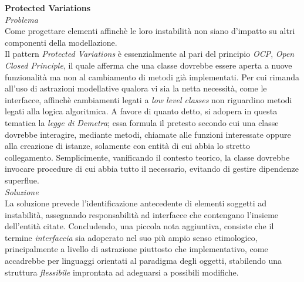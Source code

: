 \documentclass{article}
\begin{document}
\textbf{Protected Variations}\vspace*{7pt}\\
\textit{Problema}\\
Come progettare elementi affinchè le loro instabilità non siano d'impatto su altri componenti della modellazione.\vspace*{14pt}\\
Il pattern \textit{Protected Variations} è essenzialmente al pari del principio \textit{OCP}, \textit{Open Closed Principle}, il quale afferma che una classe dovrebbe essere aperta a nuove funzionalità ma non al cambiamento di metodi già implementati. Per cui rimanda all'uso di astrazioni modellative qualora vi sia la netta necessità, come le interfacce, affinchè cambiamenti legati a \textit{low level classes} non riguardino metodi legati alla logica algoritmica. A favore di quanto detto, si adopera in questa tematica la \textit{legge di Demetra}; essa formula il pretesto secondo cui una classe dovrebbe interagire, mediante metodi, chiamate alle funzioni interessate oppure alla creazione di istanze, solamente con entità di cui abbia lo stretto collegamento. Semplicimente, vanificando il contesto teorico, la classe dovrebbe invocare procedure di cui abbia tutto il necessario, evitando di gestire dipendenze superflue.\vspace*{14pt}\\
\textit{Soluzione}\\
La soluzione prevede l'identificazione antecedente di elementi soggetti ad instabilità, assegnando responsabilità ad interfacce che contengano l'insieme dell'entità citate. Concludendo, una piccola nota aggiuntiva, consiste che il termine \textit{interfaccia} sia adoperato nel suo più ampio senso etimologico, principalmente a livello di astrazione piuttosto che implementativo, come accadrebbe per linguaggi orientati al paradigma degli oggetti, stabilendo una struttura \textit{flessibile} improntata ad adeguarsi a possibili modifiche.
\end{document}

